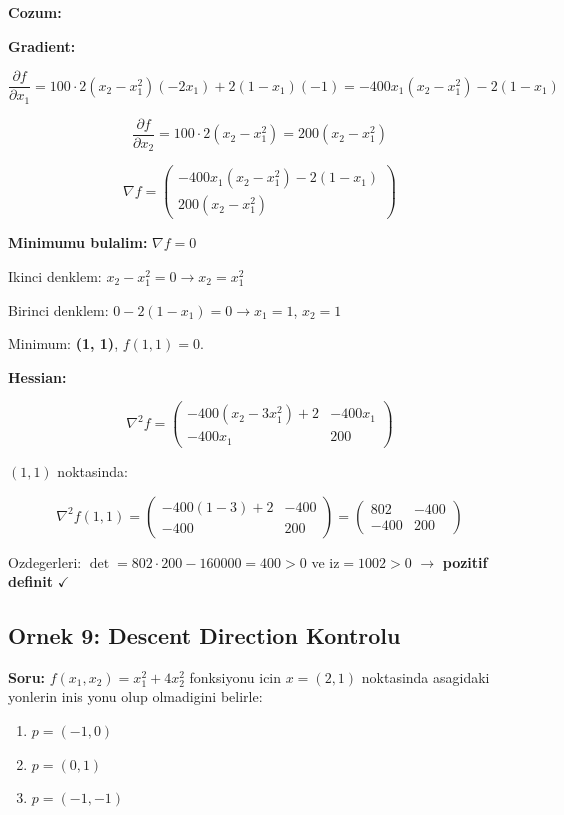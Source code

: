 \documentclass[12pt,a4paper]{article}
\theoremstyle{definition}
\theoremstyle{remark}
\begin{document}
\bigskip
\textbf{Cozum:}

\textbf{Gradient:}

\[
\frac{\partial f}{\partial x_1} = 100 \cdot 2(x_2 - x_1^2)(-2x_1) + 2(1-x_1)(-1) = -400x_1(x_2 - x_1^2) - 2(1 - x_1)
\]

\[
\frac{\partial f}{\partial x_2} = 100 \cdot 2(x_2 - x_1^2) = 200(x_2 - x_1^2)
\]

\[
\nabla f = \begin{pmatrix} -400x_1(x_2 - x_1^2) - 2(1-x_1) \\ 200(x_2 - x_1^2) \end{pmatrix}
\]

\textbf{Minimumu bulalim:} $\nabla f = 0$

Ikinci denklem: $x_2 - x_1^2 = 0 \rightarrow x_2 = x_1^2$

Birinci denklem: $0 - 2(1 - x_1) = 0 \rightarrow x_1 = 1$, $x_2 = 1$

Minimum: \textbf{(1, 1)}, $f(1,1) = 0$.

\textbf{Hessian:}

\[
\nabla^2 f = \begin{pmatrix} -400(x_2 - 3x_1^2) + 2 & -400x_1 \\ -400x_1 & 200 \end{pmatrix}
\]

$(1,1)$ noktasinda:

\[
\nabla^2 f(1,1) = \begin{pmatrix} -400(1-3) + 2 & -400 \\ -400 & 200 \end{pmatrix} = \begin{pmatrix} 802 & -400 \\ -400 & 200 \end{pmatrix}
\]

Ozdegerleri: $\det = 802 \cdot 200 - 160000 = 400 > 0$ ve $\text{iz} = 1002 > 0$ $\rightarrow$ \textbf{pozitif definit} $\checkmark$

\subsection{Ornek 9: Descent Direction Kontrolu}

\textbf{Soru:} $f(x_1, x_2) = x_1^2 + 4x_2^2$ fonksiyonu icin $x = (2, 1)$ noktasinda asagidaki yonlerin inis yonu olup olmadigini belirle:
\begin{enumerate}[label=\alph*), leftmargin=*]
\item $p = (-1, 0)$
\item $p = (0, 1)$
\item $p = (-1, -1)$
\end{enumerate}
\end{document}
